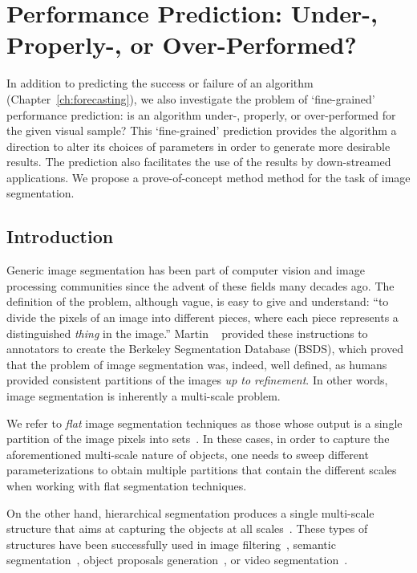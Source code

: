 \chapter{Performance Prediction: Under-, Properly-, or Over-Performed?}
\label{scale:ch:scale-aware}

In addition to predicting the success or failure of an algorithm (Chapter~\ref{ch:forecasting}),  we also investigate the problem of `fine-grained' performance prediction: is an algorithm under-, properly, or over-performed for the given visual sample? This `fine-grained' prediction provides the algorithm a direction to alter its choices of parameters  in order to generate more desirable results. The prediction also facilitates the use of the results by down-streamed applications.  
We propose a prove-of-concept method method for the task of image segmentation.  

\section{Introduction}
\label{scale:sec:intro}
Generic image segmentation has been part of computer vision and image processing communities since the
advent of these fields many decades ago.
The definition of the problem, although vague, is easy to give and understand: ``to divide the pixels of an
image into different pieces, where each piece represents a distinguished \textit{thing}
in the image.''
Martin \etal~\citep{Martin2001} provided these instructions to annotators to create
the Berkeley Segmentation Database (BSDS), which proved that the problem of image segmentation was,
indeed, well defined, as humans provided consistent partitions of the images \textit{up to refinement}.
In other words, image segmentation is inherently a multi-scale problem.

We refer to \textit{flat} image segmentation techniques as those whose output is a single partition of the
image pixels into sets~\citep{shi2000normalized,Comaniciu2002,felzenszwalb2004efficient}.
In these cases, in order to capture the aforementioned multi-scale nature of objects,
one needs to sweep different parameterizations to obtain multiple partitions that contain the
different scales when working with flat segmentation techniques.

On the other hand, hierarchical segmentation produces a single multi-scale structure that aims
at capturing the objects at all scales~\citep{arbelaez2011contour,kim2013learning,Salembier2000,Ren2013,arbelaez2014multiscale}. 
These types of structures have been successfully used in image filtering~\citep{Salembier2000},
semantic segmentation~\citep{Lempitsky2011}, object proposals generation~\citep{arbelaez2014multiscale},
or video segmentation~\citep{xu2013flattening,Varas2015}.

